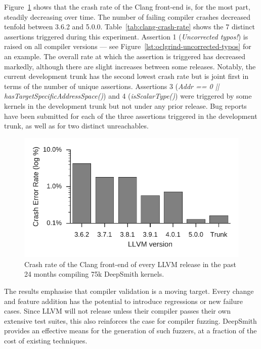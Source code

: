 Figure~\ref{fig:clang-clash-rate} shows that the crash rate of the Clang front-end is, for the most part, steadily decreasing over time. The number of failing compiler crashes decreased tenfold between 3.6.2 and 5.0.0. Table~\ref{tab:clang-crash-rate} shows the 7 distinct assertions triggered during this experiment. Assertion 1 (\emph{Uncorrected typos!}) is raised on all compiler versions --- see Figure~\ref{lst:oclgrind-uncorrected-typos} for an example. The overall rate at which the assertion is triggered has decreased markedly, although there are slight increases between some releases. Notably, the current development trunk has the second lowest crash rate but is joint first in terms of the number of unique assertions. Assertions 3 (\emph{Addr == 0 || hasTargetSpecificAddressSpace()}) and 4 (\emph{isScalarType()}) were triggered by some kernels in the development trunk but not under any prior release. Bug reports have been submitted for each of the three assertions triggered in the development trunk, as well as for two distinct unreachables.

\begin{figure}
  \centering %
  \includegraphics[width=.85\columnwidth]{img/clang-crashes}%
  \caption[Crash rate of the Clang front-end]{%
    Crash rate of the Clang front-end of every LLVM release in the past 24 months compiling 75k DeepSmith kernels.%
  }%
  \label{fig:clang-clash-rate}
\end{figure}

\begin{table}
  \centering %
  
  \caption[Number of DeepSmith programs which trigger errors]{%
    The number of DeepSmith programs which trigger distinct Clang front-end assertions, and the number of programs which trigger unreachables.%
  }
  \label{tab:clang-crash-rate}
\end{table}

The results emphasise that compiler validation is a moving target. Every change and feature addition has the potential to introduce regressions or new failure cases. Since LLVM will not release unless their compiler passes their own extensive test suites, this also reinforces the case for compiler fuzzing. DeepSmith provides an effective means for the generation of such fuzzers, at a fraction of the cost of existing techniques.


